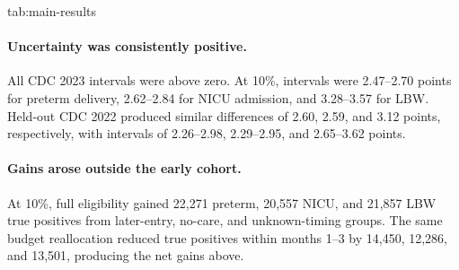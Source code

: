 \documentclass[pmlr,twocolumn,10pt]{jmlr}
\begin{document}
\begin{table}[t]
\floatconts
  {tab:main-results}
  {\caption{CDC 2023 temporal-test results at the target-specific 10\%
  absolute referral budget. Capture is population event capture; intervals
  are paired bootstrap percentile intervals from 500 replicates.}}
  {\centering
  \scriptsize
  \setlength{\tabcolsep}{2.9pt}
  }
\end{table}

\paragraph{Uncertainty was consistently positive.}
All CDC 2023 intervals were above zero. At 10\%, intervals were 2.47--2.70
points for preterm delivery, 2.62--2.84 for NICU admission, and 3.28--3.57
for LBW. Held-out CDC 2022 produced similar differences of 2.60, 2.59, and
3.12 points, respectively, with intervals of 2.26--2.98, 2.29--2.95, and
2.65--3.62 points.

\paragraph{Gains arose outside the early cohort.}
At 10\%, full eligibility gained 22,271 preterm, 20,557 NICU, and 21,857 LBW
true positives from later-entry, no-care, and unknown-timing groups. The same
budget reallocation reduced true positives within months 1--3 by 14,450,
12,286, and 13,501, producing the net gains above.
\end{document}
